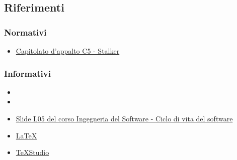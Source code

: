 \subsection{Riferimenti} 
\subsubsection{Normativi}
\begin{itemize}
	\item \href{https://www.math.unipd.it/~tullio/IS-1/2019/Progetto/C5.pdf}{Capitolato d'appalto C5 - Stalker}
\end{itemize}

\subsubsection{Informativi}
\begin{itemize}
	\item {}
	\item {}
	\item \href{https://www.math.unipd.it/~tullio/IS-1/2019/Dispense/L05.pdf}{Slide L05 del corso Ingegneria del Software - Ciclo di vita del software}
	\item \href{https://www.latex-project.org/help/documentation/}{\LaTeX}
	\item \href{https://www.texstudio.org/}{TeXStudio}
\end{itemize}